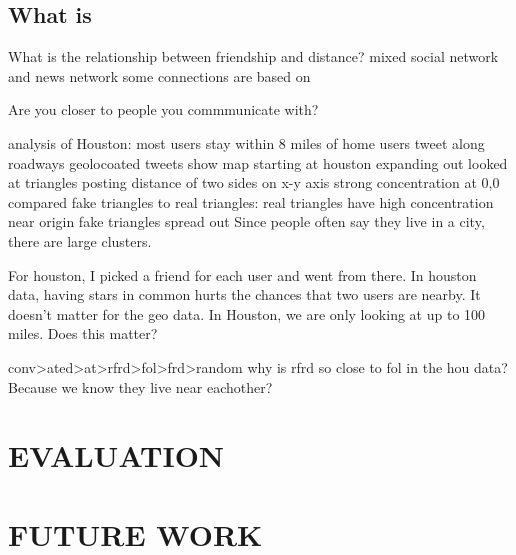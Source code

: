 \documentclass{sig-alternate}
\begin{document}
\subsection{What is }
What is the relationship between friendship and distance?
mixed social network and news network
some connections are based on 

Are you closer to people you commmunicate with?















analysis of Houston:
most users stay within 8 miles of home
users tweet along roadways
geolocoated tweets show map starting at houston expanding out
looked at triangles posting distance of two sides on x-y axis
strong concentration at 0,0
compared fake triangles to real triangles:
    real triangles have high concentration near origin
    fake triangles spread out
Since people often say they live in a city, there are large clusters.

For houston, I picked a friend for each user and went from there.
In houston data, having stars in common hurts the chances that two users are nearby.  It doesn't matter for the geo data. In Houston, we are only looking at up to 100 miles. Does this matter?


conv>ated>at>rfrd>fol>frd>random
why is rfrd so close to fol in the hou data? Because we know they live near eachother?








\section{EVALUATION}
\section{FUTURE WORK}


 
\end{document}
